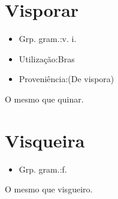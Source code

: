 \documentclass{article}
\begin{document}
\section{Visporar}
\begin{itemize}
\item {Grp. gram.:v. i.}
\end{itemize}
\begin{itemize}
\item {Utilização:Bras}
\end{itemize}
\begin{itemize}
\item {Proveniência:(De \textunderscore vispora\textunderscore )}
\end{itemize}
O mesmo que \textunderscore quinar\textunderscore .
\section{Visqueira}
\begin{itemize}
\item {Grp. gram.:f.}
\end{itemize}
O mesmo que \textunderscore visgueiro\textunderscore .
\end{document}
